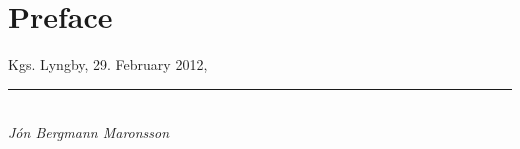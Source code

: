 \section*{Preface}

\placeholder

\vspace{10mm}

\begin{flushright}
Kgs. Lyngby, 29. February 2012,\\

\vspace{15mm}

\rule{50mm}{0.1pt}\\
\textit{J\'on Bergmann Maronsson}
\end{flushright}
